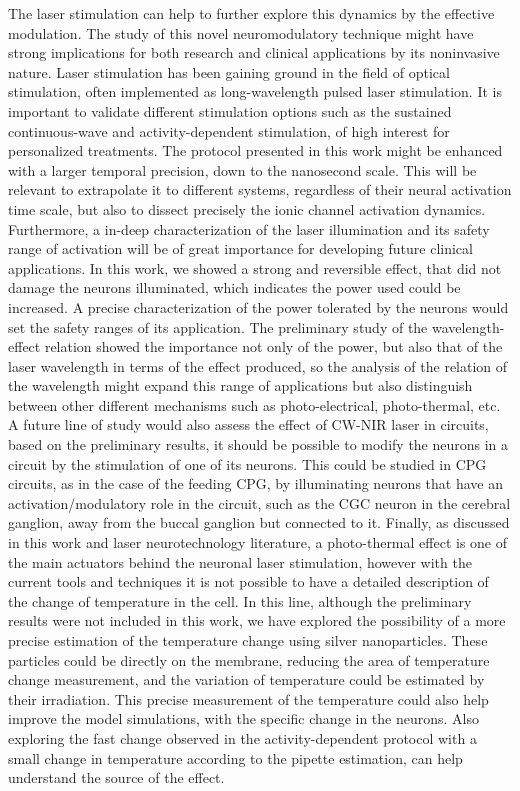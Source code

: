 The laser stimulation can help to further explore this dynamics by the effective modulation. The study of this novel neuromodulatory technique might have strong implications for both research and clinical applications by its noninvasive nature. Laser stimulation has been gaining ground in the field of optical stimulation, often implemented as long-wavelength pulsed laser stimulation. It is important to validate different stimulation options such as the sustained continuous-wave and activity-dependent stimulation, of high interest for personalized treatments. The protocol presented in this work might be enhanced with a larger temporal precision, down to the nanosecond scale. This will be relevant to extrapolate it to different systems, regardless of their neural activation time scale, but also to dissect precisely the ionic channel activation dynamics. Furthermore, a in-deep characterization of the laser illumination and its safety range of activation will be of great importance for developing future clinical applications. In this work, we showed a strong and reversible effect, that did not damage the neurons illuminated, which indicates the power used could be increased. A precise characterization of the power tolerated by the neurons would set the safety ranges of its application. The preliminary study of the wavelength-effect relation showed the importance not only of the power, but also that of the laser wavelength in terms of the effect produced, so the analysis of the relation of the wavelength might expand this range of applications but also distinguish between other different mechanisms such as photo-electrical, photo-thermal, etc. A future line of study would also assess the effect of CW-NIR laser in circuits, based on the preliminary results, it should be possible to modify the neurons in a circuit by the stimulation of one of its neurons. This could be studied in CPG circuits, as in the case of the feeding CPG, by illuminating neurons that have an activation/modulatory role in the circuit, such as the CGC neuron in the cerebral ganglion, away from the buccal ganglion but connected to it. Finally, as discussed in this work and laser neurotechnology literature, a photo-thermal effect is one of the main actuators behind the neuronal laser stimulation, however with the current tools and techniques it is not possible to have a detailed description of the change of temperature in the cell. In this line, although the preliminary results were not included in this work, we have explored the possibility of a more precise estimation of the temperature change using silver nanoparticles. These particles could be directly on the membrane, reducing the area of temperature change measurement, and the variation of temperature could be estimated by their irradiation. This precise measurement of the temperature could also help improve the model simulations, with the specific change in the neurons. Also exploring the fast change observed in the activity-dependent protocol with a small change in temperature according to the pipette estimation, can help understand the source of the effect.

